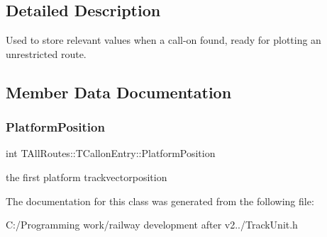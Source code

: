 \subsection{Detailed Description}
Used to store relevant values when a call-\/on found, ready for plotting an unrestricted route. 

\subsection{Member Data Documentation}
\mbox{\label{class_t_all_routes_1_1_t_callon_entry_a538fe345a1cd31068c96302ef0055bd3}} 
\subsubsection{\texorpdfstring{Platform\+Position}{PlatformPosition}}
{\footnotesize\ttfamily int T\+All\+Routes\+::\+T\+Callon\+Entry\+::\+Platform\+Position}

the first platform trackvectorposition 

The documentation for this class was generated from the following file\+:\begin{DoxyCompactItemize}
\item 
C\+:/\+Programming work/railway development after v2../Track\+Unit.\+h\end{DoxyCompactItemize}
